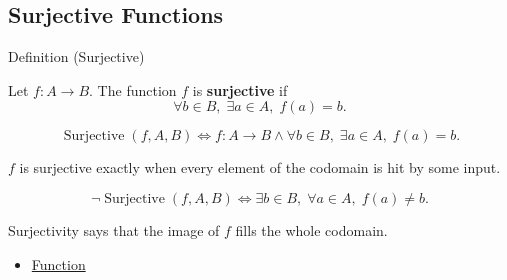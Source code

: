 \subsection*{Surjective Functions}
\label{subsec:surjective-functions}

\begin{definitionbox}{Definition (Surjective)}
\begin{definition}
\label{def:alg-surjective}
Let $f:A\to B$.
The function $f$ is \textbf{surjective} if
\[
\forall b \in B,\; \exists a \in A,\; f(a)=b.
\]
\end{definition}
\end{definitionbox}

\begin{remark*}
\[
\operatorname{Surjective}(f,A,B)
\Longleftrightarrow
f:A\to B
\land
\forall b\in B,\; \exists a\in A,\; f(a)=b.
\]
\end{remark*}

\begin{remark*}
$f$ is surjective exactly when every element of the codomain is hit by some
input.
\end{remark*}

\begin{remark*}
\[
\neg\operatorname{Surjective}(f,A,B)
\Longleftrightarrow
\exists b\in B,\; \forall a\in A,\; f(a)\neq b.
\]
\end{remark*}

\begin{remark*}[Interpretation]
Surjectivity says that the image of $f$ fills the whole codomain.
\end{remark*}

\begin{dependencies}
\begin{itemize}
  \item \hyperref[def:alg-function]{Function}
\end{itemize}
\end{dependencies}
